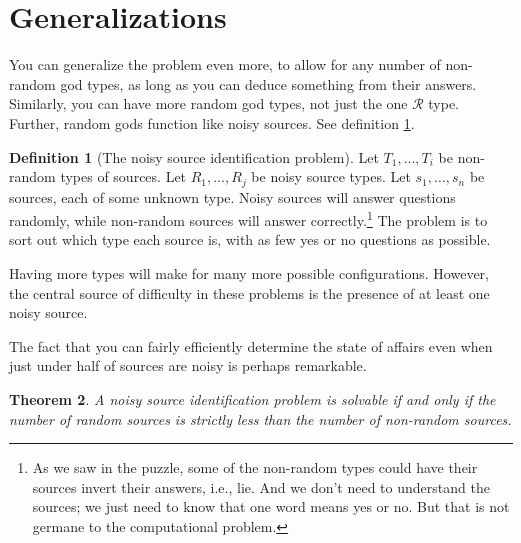 \documentclass[twoside,twocolumn,a4paper,11pt]{article}
\newtheorem{theorem}{Theorem}[section]
\theoremstyle{definition}
\newtheorem{defn}[theorem]{Definition}
\begin{document}
\enlargethispage{-1.5\baselineskip}



\section{Generalizations}
You can generalize the problem even more, to allow for any number of 
non-random
god types, 
as long as you can deduce something from their answers. 
Similarly, 
you can have more random god types, not just the one $\mathcal{R}$ type.
Further,
random gods function like noisy sources. 
See definition \ref{def:gen}.
\begin{defn}[The noisy source identification problem]
\label{def:gen}
Let $T_1,\ldots,T_i$ be 
non-random
types of sources. 
Let $R_1,\ldots,R_j$ be noisy source types. 
Let $s_1,\ldots,s_n$ be sources, each of some unknown type.
Noisy sources will answer questions randomly, while 
non-random sources will answer 
correctly.\footnote{As 
we saw in the puzzle, some of the non-random types could have their sources invert their answers, i.e., lie.
And we don't need to understand the sources; we just need to know that one word means yes or no. But 
that is not germane to the computational problem.}
The problem is to sort out which type each source is,
with as few yes or no questions as possible.
\end{defn}

Having more types will make for many more 
possible
configurations.
However, 
the central source of difficulty in these problems is the presence 
of 
at least one noisy source.

The fact that you can fairly efficiently determine 
the state of affairs even
when just under half of 
sources are noisy
is perhaps remarkable.

\begin{theorem}
A noisy source identification problem is solvable if and only if 
the number of random sources is strictly less than the number of non-random sources.
\end{theorem}
\end{document}
